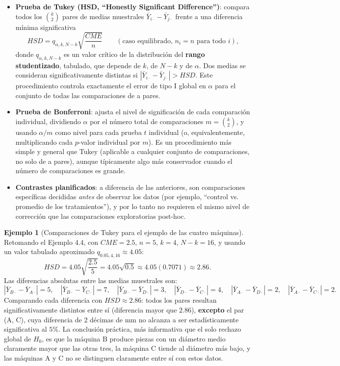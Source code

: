 \documentclass[11pt,a4paper]{article}
\theoremstyle{plain}
\theoremstyle{definition}
\newtheorem{ejemplo}[teorema]{Ejemplo}
\theoremstyle{remark}
\begin{document}
\begin{itemize}
\item \textbf{Prueba de Tukey (HSD, ``Honestly Significant Difference'')}: compara todos los $\binom{k}{2}$ pares de medias muestrales $\bar Y_{i\cdot}-\bar Y_{j\cdot}$ frente a una diferencia mínima significativa
\[
HSD = q_{\alpha,k,N-k}\sqrt{\frac{CME}{n}} \qquad (\text{caso equilibrado, } n_i=n \text{ para todo } i),
\]
donde $q_{\alpha,k,N-k}$ es un valor crítico de la distribución del \textbf{rango studentizado}, tabulado, que depende de $k$, de $N-k$ y de $\alpha$. Dos medias se consideran significativamente distintas si $|\bar Y_{i\cdot}-\bar Y_{j\cdot}|>HSD$. Este procedimiento controla exactamente el error de tipo I global en $\alpha$ para el conjunto de todas las comparaciones de a pares.
\item \textbf{Prueba de Bonferroni}: ajusta el nivel de significación de cada comparación individual, dividiendo $\alpha$ por el número total de comparaciones $m=\binom{k}{2}$, y usando $\alpha/m$ como nivel para cada prueba $t$ individual (o, equivalentemente, multiplicando cada $p$-valor individual por $m$). Es un procedimiento más simple y general que Tukey (aplicable a cualquier conjunto de comparaciones, no solo de a pares), aunque típicamente algo más conservador cuando el número de comparaciones es grande.
\item \textbf{Contrastes planificados}: a diferencia de las anteriores, son comparaciones específicas decididas \emph{antes} de observar los datos (por ejemplo, ``control vs. promedio de los tratamientos''), y por lo tanto no requieren el mismo nivel de corrección que las comparaciones exploratorias post-hoc.
\end{itemize}

\begin{ejemplo}[Comparaciones de Tukey para el ejemplo de las cuatro máquinas]
Retomando el Ejemplo 4.4, con $CME=2.5$, $n=5$, $k=4$, $N-k=16$, y usando un valor tabulado aproximado $q_{0.05,4,16}\approx4.05$:
\[
HSD = 4.05\sqrt{\frac{2.5}{5}} = 4.05\sqrt{0.5} \approx 4.05(0.7071) \approx 2.86.
\]
Las diferencias absolutas entre las medias muestrales son:
\[
|\bar Y_{B\cdot}-\bar Y_{A\cdot}|=5, \quad |\bar Y_{B\cdot}-\bar Y_{C\cdot}|=7, \quad |\bar Y_{B\cdot}-\bar Y_{D\cdot}|=3, \quad |\bar Y_{D\cdot}-\bar Y_{C\cdot}|=4, \quad |\bar Y_{A\cdot}-\bar Y_{D\cdot}|=2, \quad |\bar Y_{A\cdot}-\bar Y_{C\cdot}|=2.
\]
Comparando cada diferencia con $HSD\approx2.86$: todos los pares resultan significativamente distintos entre sí (diferencia mayor que $2.86$), \textbf{excepto} el par (A, C), cuya diferencia de $2$ décimas de mm no alcanza a ser estadísticamente significativa al $5\%$. La conclusión práctica, más informativa que el solo rechazo global de $H_0$, es que la máquina B produce piezas con un diámetro medio claramente mayor que las otras tres, la máquina C tiende al diámetro más bajo, y las máquinas A y C no se distinguen claramente entre sí con estos datos.
\end{ejemplo}
\end{document}
